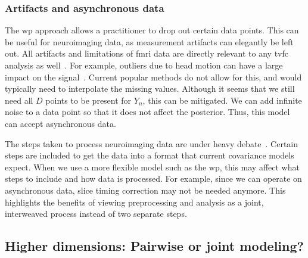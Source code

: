 \subsubsection{Artifacts and asynchronous data}

The \gls{wp} approach allows a practitioner to drop out certain data points.
This can be useful for neuroimaging data, as measurement artifacts can elegantly be left out.
All artifacts and limitations of \gls{fmri} data are directly relevant to any \gls{tvfc} analysis as well~\parencite{Nalci2019}.
For example, outliers due to head motion can have a large impact on the signal~\parencite{Power2014, Power2015}.
Current popular methods do not allow for this, and would typically need to interpolate the missing values.
%
Although it seems that we still need all $D$ points to be present for $Y_n$, this can be mitigated.
We can add infinite noise to a data point so that it does not affect the posterior.
Thus, this model can accept asynchronous data.

The steps taken to process neuroimaging data are under heavy debate~\parencite[see e.g.][]{Poldrack2017, Botvinik-Nezer2020, Lindquist2020, Elliott2021}.
Certain steps are included to get the data into a format that current covariance models expect.
When we use a more flexible model such as the \gls{wp}, this may affect what steps to include and how data is processed.
For example, since we can operate on asynchronous data, slice timing correction may not be needed anymore.
This highlights the benefits of viewing preprocessing and analysis as a joint, interweaved process instead of two separate steps.

\subsection{Higher dimensions: Pairwise or joint modeling?}
\label{subsec:higher-dimensions}

